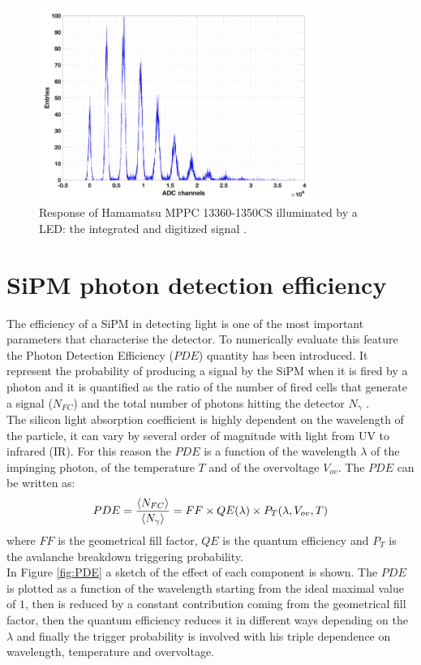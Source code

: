 \begin{figure}
	\centering
	\includegraphics[width=0.8\textwidth]{IMG/Cap3/MPCS.png}
	\caption{Response of Hamamatsu MPPC 13360-1350CS illuminated by a LED: the integrated and digitized signal \cite{MPCS}.}
	\label{fig:MPCS}
\end{figure}

\section{SiPM photon detection efficiency}\label{sec:PDE}
The efficiency of a SiPM in detecting light is one of the most important parameters that characterise the detector. To numerically evaluate this feature the Photon Detection Efficiency ($PDE$) quantity has been introduced. It represent the probability of producing a signal by the SiPM when it is fired by a photon and it is quantified as the ratio of the number of fired cells that generate a signal ($N_{FC}$) and the total number of photons hitting the detector $N_{\gamma}$ \cite{PDE}.\\
The silicon light absorption coefficient is highly dependent on the wavelength of the particle, it can vary by several order of magnitude with light from UV to infrared (IR). For this reason the $PDE$ is a function of the wavelength $\lambda$ of the impinging photon, of the temperature $T$ and of the overvoltage $V_{ov}$. The $PDE$ can be written as:
\begin{equation}
    PDE = \frac{\expval{N_{FC}}}{\expval{N_{\gamma}}} = FF \times QE(\lambda) \times P_T(\lambda,V_{ov},T)
\end{equation}
where $FF$ is the geometrical fill factor, $QE$ is the quantum efficiency and $P_T$ is the avalanche breakdown triggering probability.\\
In Figure \ref{fig:PDE} a sketch of the effect of each component is shown. The $PDE$ is plotted as a function of the wavelength starting from the ideal maximal value of $1$, then is reduced by a constant contribution coming from the geometrical fill factor, then the quantum efficiency reduces it in different ways depending on the $\lambda$ and finally the trigger probability is involved with his triple dependence on wavelength, temperature and overvoltage.

